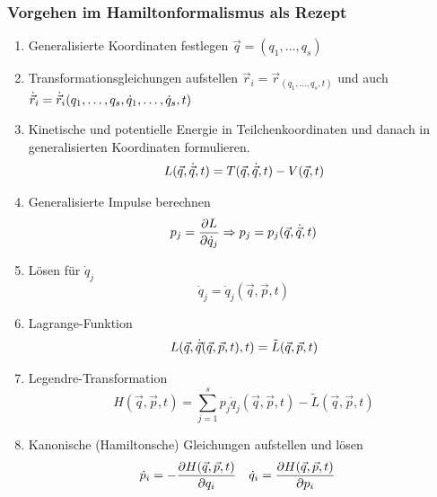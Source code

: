 \subsubsection{Vorgehen im Hamiltonformalismus als Rezept}
\begin{enumerate}
	\item Generalisierte Koordinaten festlegen $\vec{q} = (q_1, \dots, q_s)$
	\item Transformationsgleichungen aufstellen $\vec{r}_i = \vec{r}_(q_1, \dots, q_s, t)$ und auch $\dot{\vec{r}}_i = \dot{\vec{r}}_i(q_1, \dots, q_s, \dot{q}_1, \dots, \dot{q}_s, t)$
	\item Kinetische und potentielle Energie in Teilchenkoordinaten und danach in generalisierten Koordinaten formulieren.
	$$L(\vec{q}, \dot{\vec{q}}, t) = T(\vec{q}, \dot{\vec{q}},t)  - V(\vec{q}, t)$$
	\item Generalisierte Impulse berechnen
		$$p_j = \frac{\partial L}{\partial \dot{q}_j} \Rightarrow p_j = p_j(\vec{q}, \dot{\vec{q}}, t)$$
	\item Lösen für $\dot{q}_j$
	$$\dot{q}_j = \dot{q}_j (\vec{q}, \vec{p}, t)$$
	\item Lagrange-Funktion
	$$L(\vec{q}, \dot{\vec{q}}(\vec{q}, \vec{p}, t), t) = \tilde{L}(\vec{q}, \vec{p}, t)$$
	\item Legendre-Transformation
	$$H(\vec{q}, \vec{p}, t) = \sum_{j=1}^s p_j \dot{q}_j(\vec{q}, \vec{p}, t) - \tilde{L}(\vec{q}, \vec{p}, t)$$
	\item Kanonische (Hamiltonsche) Gleichungen aufstellen und lösen
	\begin{align*}
	\dot{p}_i &= -\frac{\partial H(\vec{q},\vec{p},t)}{\partial q_i} & \dot{q}_i &= \frac{\partial H(\vec{q},\vec{p},t)}{\partial p_i}
	\end{align*}
\end{enumerate}

